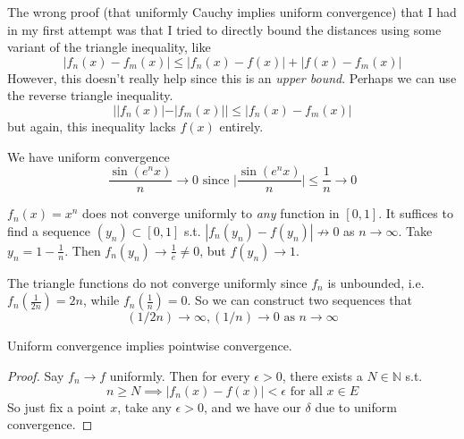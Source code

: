   The wrong proof (that uniformly Cauchy implies uniform convergence) that I had in my first attempt was that I tried to directly bound the distances using some variant of the triangle inequality, like 
  \begin{equation}
    |f_n (x) - f_m (x)| \leq |f_n (x) - f(x)| + |f(x) - f_m (x)|
  \end{equation}
  However, this doesn't really help since this is an \textit{upper bound}. Perhaps we can use the reverse triangle inequality. 
  \begin{equation}
    | |f_n (x)| - |f_m (x)| | \leq |f_n (x) - f_m (x)|
  \end{equation}
  but again, this inequality lacks $f(x)$ entirely. 

  \begin{example}
    We have uniform convergence
    \begin{equation}
      \frac{\sin(e^n x)}{n} \to 0 \text{ since  } \bigg| \frac{\sin(e^n x)}{n} \bigg| \leq \frac{1}{n} \to 0
    \end{equation}
  \end{example}

  \begin{example}
    $f_n (x) = x^n$ does not converge uniformly to \textit{any} function in $[0, 1]$. It suffices to find a sequence $(y_n) \subset [0, 1]$ s.t. $|f_n (y_n) - f(y_n)| \not\to 0$ as $n \to \infty$. Take $y_n = 1 - \frac{1}{n}$. Then $f_n (y_n) \to \frac{1}{e} \neq 0$, but $f(y_n) \to 1$. 
  \end{example}

  \begin{example}
    The triangle functions do not converge uniformly since $f_n$ is unbounded, i.e. $f_n (\frac{1}{2n}) = 2n$, while $f_n ( \frac{1}{n}) = 0$. So we can construct two sequences that  
    \begin{equation}
      (1/2n) \to \infty, (1/n) \to 0 \text{ as } n \to \infty
    \end{equation}
  \end{example}

  \begin{lemma}
    Uniform convergence implies pointwise convergence. 
  \end{lemma}
  \begin{proof}
    Say $f_n \to f$ uniformly. Then for every $\epsilon > 0$, there exists a $N \in \mathbb{N}$ s.t. 
    \begin{equation}
      n \geq N \implies |f_n (x) - f(x)| < \epsilon \text{ for all } x \in E
    \end{equation}
    So just fix a point $x$, take any $\epsilon > 0$, and we have our $\delta$ due to uniform convergence. 
  \end{proof}


